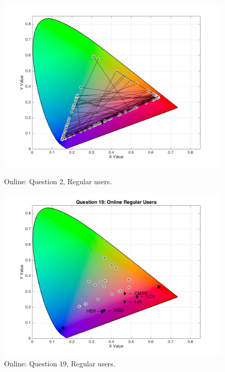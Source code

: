 \begin{figure}[!htbp]
  \centering
  \vspace{-5pt}
  \begin{minipage}{0.4\textwidth}
    \centering
    \includegraphics[width=\textwidth]{images/results/2_online_regularUsers.png}
    \caption[Online: Answers for Question 2, from regular users.]{Online: Question 2, Regular users.}
    \label{fig:magentablend_1}
  \end{minipage}
  \begin{minipage}{0.4\textwidth}
    \centering
    \includegraphics[width=\textwidth]{images/results/19_online_regularUsers.png}
    \caption[Online: Answers for Question 19, from regular users.]{Online: Question 19, Regular users.}
    \label{fig:magentablend_2}
  \end{minipage}
  \vspace{-5pt}
\end{figure}
%
